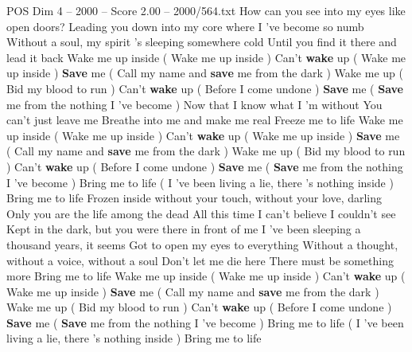\begin{textsample}{POS Dim 4 – 2000 – Score 2.00 – 2000/564.txt}  \label{ex:f4_pos_016}
How can you see into my eyes like open doors?
Leading you down into my core where I 've become so numb Without a soul, my spirit 's sleeping somewhere cold Until you find it there and lead it back Wake me up inside ( Wake me up inside ) Can't \textbf{wake} up ( Wake me up inside ) \textbf{Save} me ( Call my name and \textbf{save} me from the dark ) Wake me up ( Bid my blood to run ) Can't \textbf{wake} up ( Before I come undone ) \textbf{Save} me ( \textbf{Save} me from the nothing I 've become ) Now that I know what I 'm without You can't just leave me Breathe into me and make me real Freeze me to life Wake me up inside ( Wake me up inside ) Can't \textbf{wake} up ( Wake me up inside ) \textbf{Save} me ( Call my name and \textbf{save} me from the dark ) Wake me up ( Bid my blood to run ) Can't \textbf{wake} up ( Before I come undone ) \textbf{Save} me ( \textbf{Save} me from the nothing I 've become ) Bring me to life ( I 've been living a lie, there 's nothing inside ) Bring me to life Frozen inside without your touch, without your love, darling Only you are the life among the dead All this time I can't believe I couldn't see Kept in the dark, but you were there in front of me I 've been sleeping a thousand years, it seems Got to open my eyes to everything Without a thought, without a voice, without a soul Don't let me die here There must be something more Bring me to life Wake me up inside ( Wake me up inside ) Can't \textbf{wake} up ( Wake me up inside ) \textbf{Save} me ( Call my name and \textbf{save} me from the dark ) Wake me up ( Bid my blood to run ) Can't \textbf{wake} up ( Before I come undone ) \textbf{Save} me ( \textbf{Save} me from the nothing I 've become ) Bring me to life ( I 've been living a lie, there 's nothing inside ) Bring me to life

\end{textsample}

